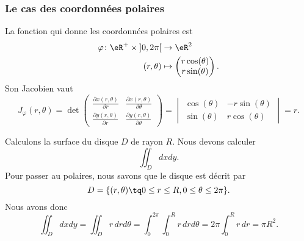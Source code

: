\subsubsection{Le cas des coordonnées polaires}

La fonction qui donne les coordonnées polaires est
\begin{equation}
    \begin{aligned}
        \varphi\colon \eR^+\times\mathopen] 0 , 2\pi \mathclose[&\to \eR^2 \\
        (r,\theta)&\mapsto\begin{pmatrix}
            r\cos(\theta)    \\
            r\sin(\theta)
        \end{pmatrix}.
    \end{aligned}
\end{equation}
Son Jacobien vaut
\begin{equation}
    J_{\varphi}(r,\theta)=\det\begin{pmatrix}
        \frac{ \partial x(r,\theta) }{ \partial r }    &   \frac{ \partial x(r,\theta) }{ \partial \theta }    \\
        \frac{ \partial y(r,\theta) }{ \partial r }    &   \frac{ \partial y(r,\theta) }{ \partial \theta }
    \end{pmatrix}=
    \begin{vmatrix}
        \cos(\theta)    &   -r\sin(\theta)    \\
        \sin(\theta)    &   r\cos(\theta)
    \end{vmatrix}=r.
\end{equation}

\begin{example}
    Calculons la surface du disque $D$ de rayon $R$. Nous devons calculer
    \begin{equation}
        \iint_Ddxdy.
    \end{equation}
    Pour passer au polaires, nous savons que le disque est décrit par
    \begin{equation}
        D=\{ (r,\theta)\tq 0\leq r\leq R,0\leq\theta\leq 2\pi \}.
    \end{equation}
    Nous avons donc
    \begin{equation}
        \iint_Ddxdy=\iint_{D}r\,drd\theta=\int_0^{2\pi}\int_0^Rr\,drd\theta=2\pi\int_0^Rr\,dr=\pi R^2.
    \end{equation}
\end{example}


